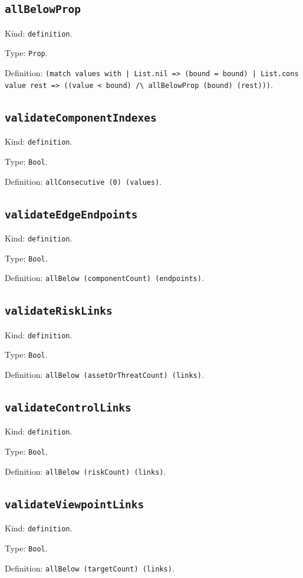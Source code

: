 \documentclass[11pt]{article}
\begin{document}
\subsection*{\texttt{allBelowProp}}
\noindent Kind: \texttt{definition}.\par
\noindent Type: \texttt{Prop}.\par
\noindent Definition: \texttt{(match values with | List.nil => (bound = bound) | List.cons value rest => ((value < bound) /\textbackslash{} allBelowProp (bound) (rest)))}.\par
\subsection*{\texttt{validateComponentIndexes}}
\noindent Kind: \texttt{definition}.\par
\noindent Type: \texttt{Bool}.\par
\noindent Definition: \texttt{allConsecutive (0) (values)}.\par
\subsection*{\texttt{validateEdgeEndpoints}}
\noindent Kind: \texttt{definition}.\par
\noindent Type: \texttt{Bool}.\par
\noindent Definition: \texttt{allBelow (componentCount) (endpoints)}.\par
\subsection*{\texttt{validateRiskLinks}}
\noindent Kind: \texttt{definition}.\par
\noindent Type: \texttt{Bool}.\par
\noindent Definition: \texttt{allBelow (assetOrThreatCount) (links)}.\par
\subsection*{\texttt{validateControlLinks}}
\noindent Kind: \texttt{definition}.\par
\noindent Type: \texttt{Bool}.\par
\noindent Definition: \texttt{allBelow (riskCount) (links)}.\par
\subsection*{\texttt{validateViewpointLinks}}
\noindent Kind: \texttt{definition}.\par
\noindent Type: \texttt{Bool}.\par
\noindent Definition: \texttt{allBelow (targetCount) (links)}.\par
\end{document}
